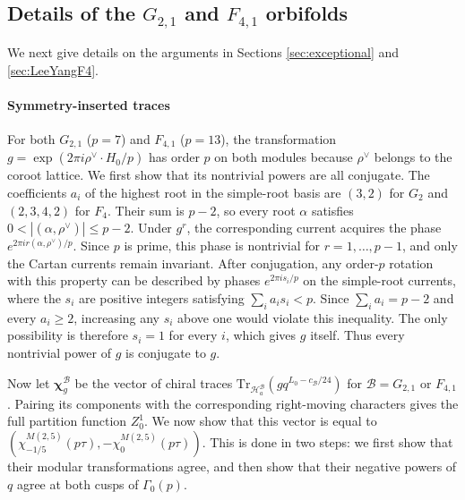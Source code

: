 \documentclass[12pt]{article}
\numberwithin{equation}{section}
\newcommand{\Tr}{\mathrm{Tr}}
\theoremstyle{remark}
\begin{document}
\subsection{Details of the $G_{2,1}$ and $F_{4,1}$ orbifolds}
\label{app:exceptionalproof}

We next give details on the arguments in Sections \ref{sec:exceptional} and \ref{sec:LeeYangF4}. 

\paragraph{Symmetry-inserted traces}

For both $G_{2,1}$ ($p=7$) and $F_{4,1}$ ($p=13$), the transformation $g=\exp(2\pi i\rho^\vee\cdot H_0/p)$ has order $p$ on both modules because $\rho^\vee$ belongs to the coroot lattice. We first show that its nontrivial powers are all conjugate. The coefficients $a_i$ of the highest root in the simple-root basis are $(3,2)$ for $G_2$ and $(2,3,4,2)$ for $F_4$. Their sum is $p-2$, so every root $\alpha$ satisfies $0<|(\alpha,\rho^\vee)|\leq p-2$. Under $g^r$, the corresponding current acquires the phase $e^{2\pi i r(\alpha,\rho^\vee)/p}$. Since $p$ is prime, this phase is nontrivial for $r=1,\ldots,p-1$, and only the Cartan currents remain invariant. After conjugation, any order-$p$ rotation with this property can be described by phases $e^{2\pi i s_i/p}$ on the simple-root currents, where the $s_i$ are positive integers satisfying $\sum_i a_i s_i<p$. Since $\sum_i a_i=p-2$ and every $a_i\geq2$, increasing any $s_i$ above one would violate this inequality. The only possibility is therefore $s_i=1$ for every $i$, which gives $g$ itself. Thus every nontrivial power of $g$ is conjugate to $g$.

Now let $\boldsymbol{\chi}^{\mathcal B}_g$ be the vector of chiral traces $\Tr_{\mathcal H^{\mathcal B}_a}(gq^{L_0-c_{\mathcal B}/24})$ for $\mathcal B=G_{2,1}$ or $F_{4,1}$. Pairing its components with the corresponding right-moving characters gives the full partition function $Z^1_0$. We now show that this vector is equal to $(\chi^{M(2,5)}_{-1/5}(p\tau),-\chi^{M(2,5)}_0(p\tau))$. This is done in two steps: we first show that their modular transformations agree, and then show that their negative powers of $q$ agree at both cusps of $\Gamma_0(p)$. 
\end{document}
